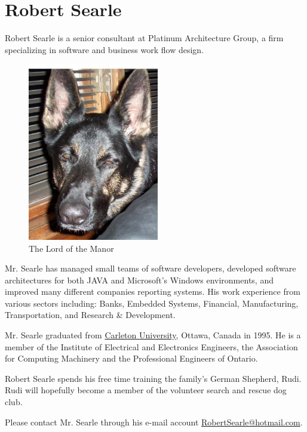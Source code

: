 \section {Robert Searle}
\par Robert Searle is a senior consultant at Platinum Architecture Group, a firm specializing in software and business work flow design.
\begin{figure}
	\includegraphics[width=2.25in]{000_0052}
	\caption [Rudi] {The Lord of the Manor}
\end{figure}
\par Mr. Searle has managed small teams of software developers, developed software architectures for both JAVA and Microsoft's Windows environments, and improved many different companies reporting systems. His work experience from various sectors including: Banks, Embedded Systems, Financial, Manufacturing, Transportation, and Research \& Development.
\par Mr. Searle graduated from \href{http://www.carleton.ca/}{Carleton University}, Ottawa, Canada in 1995. He is a member of the Institute of Electrical and Electronics Engineers, the Association for Computing Machinery and the Professional Engineers of Ontario. 
\par Robert Searle spends his free time training the family's German Shepherd, Rudi. Rudi will hopefully become a member of the volunteer search and rescue dog club.
\par Please contact Mr. Searle through his e-mail account \href{mailto:robertsearle@hotmail.com}{RobertSearle@hotmail.com}.
\newpage
